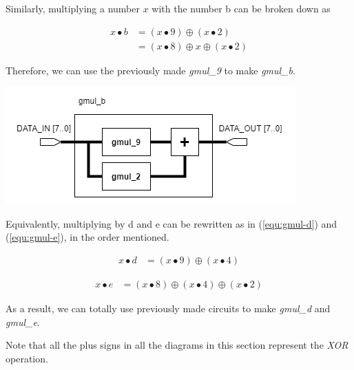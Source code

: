 \documentclass[a4paper, 10pt]{article}
\newenvironment{Figure}
    {\par\medskip\noindent\minipage{\linewidth}}
    {\endminipage\par\medskip}
\begin{document}
\begin{multicols}{2}
	Similarly, multiplying a number $x$ with the number b can be broken down as

\begin{equation}
\begin{aligned}
	x \bullet b & = (x \bullet 9) \oplus (x \bullet 2) \\
	& = (x \bullet 8) \oplus x \oplus (x \bullet 2)
\end{aligned}
\end{equation}

	Therefore, we can use the previously made \textit{gmul\_9} to make \textit{gmul\_b}.

	\noindent
            \begin{Figure}
                \centering
                \includegraphics[width=\linewidth]{InvMixColumns-gmul_b.png}
                \label{fig:gmul-b}
            \end{Figure}

	Equivalently, multiplying by d and e can be rewritten as in (\ref{equ:gmul-d}) and (\ref{equ:gmul-e}), in the order mentioned.

\begin{equation}
\label{equ:gmul-d}
\begin{aligned}
	x \bullet d & = (x \bullet 9) \oplus (x \bullet 4)
\end{aligned}
\end{equation}

\begin{equation}
\label{equ:gmul-e}
\begin{aligned}
	x \bullet e & = (x \bullet 8) \oplus (x \bullet 4) \oplus (x \bullet 2)
\end{aligned}
\end{equation}

	As a result, we can totally use previously made circuits to make \textit{gmul\_d} and \textit{gmul\_e}.

	Note that all the plus signs in all the diagrams in this section represent the \textit{XOR} operation.


\end{multicols}
\end{document}
